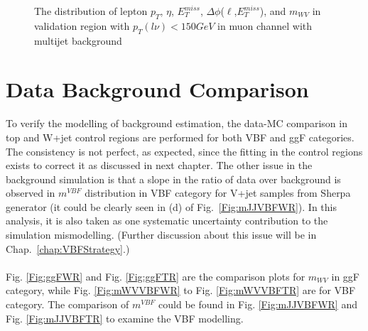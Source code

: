 \begin{figure}[ht]
	\caption{The distribution of lepton $p_{T}$, $\eta$, $E_{T}^{miss}$, $\Delta\phi$($\ell$,$E_{T}^{miss}$), and $m_{WV}$ in validation region with $p_{T}(l\nu)<150 GeV$ in muon channel with multijet background}
	\label{fig:FakeVR2_mu}
\end{figure}

\section{Data Background Comparison}
\label{Sec:data_bkg_compar}
To verify the modelling of background estimation, the data-MC comparison in top and W+jet control regions are performed for both VBF and ggF categories. The consistency is not perfect, as expected, since the fitting in the control regions exists to correct it as discussed in next chapter. The other issue in the background simulation is that a slope in the ratio of data over background is observed in $m^{VBF}$ distribution in VBF category for V+jet samples from Sherpa generator (it could be clearly seen in (d) of Fig.~\ref{Fig:mJJVBFWR}). In this analysis, it is also taken as one systematic uncertainty contribution to the simulation mismodelling. (Further discussion about this issue will be in Chap.~\ref{chap:VBFStrategy}.)
\\
\\Fig. \ref{Fig:ggFWR} and Fig. \ref{Fig:ggFTR} are the comparison plots for $m_{WV}$ in ggF category, while Fig. \ref{Fig:mWVVBFWR} to Fig. \ref{Fig:mWVVBFTR} are for VBF category. The comparison of  $m^{VBF}$ could be found in Fig. \ref{Fig:mJJVBFWR} and Fig. \ref{Fig:mJJVBFTR} to examine the VBF modelling. 
\newpage


